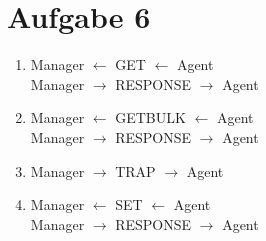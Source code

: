 \documentclass{article}
\begin{document}
	\section*{Aufgabe 6}
	\begin{enumerate}[label=(\alph*)]
		\item Manager $\leftarrow$ GET $\leftarrow$ Agent \\
		Manager $\rightarrow$ RESPONSE $\rightarrow$ Agent
		\item Manager $\leftarrow$ GETBULK $\leftarrow$ Agent \\
		Manager $\rightarrow$ RESPONSE $\rightarrow$ Agent
		\item Manager $\rightarrow$ TRAP $\rightarrow$ Agent
		\item Manager $\leftarrow$ SET $\leftarrow$ Agent \\
		Manager $\rightarrow$ RESPONSE $\rightarrow$ Agent
	\end{enumerate}
	
\end{document}
